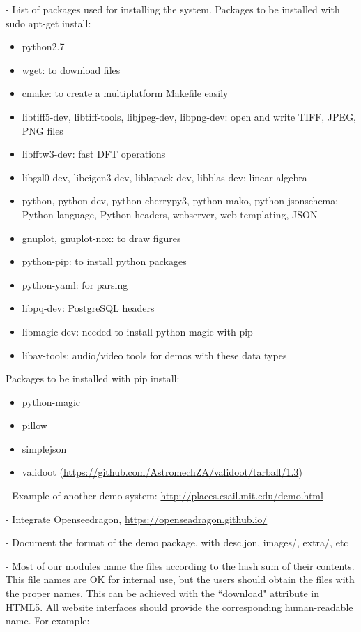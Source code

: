 \documentclass[a4paper,12pt]{article}
\begin{document}
- List of packages used for installing the system. Packages to be installed with sudo apt-get install:

\begin{itemize}
\item python2.7
\item wget: to download files
\item cmake: to create a multiplatform Makefile easily
\item libtiff5-dev, libtiff-tools, libjpeg-dev, libpng-dev: open and write TIFF, JPEG, PNG files
\item libfftw3-dev: fast DFT operations
\item libgsl0-dev, libeigen3-dev, liblapack-dev, libblas-dev: linear algebra
\item python, python-dev, python-cherrypy3, python-mako, python-jsonschema: Python language, Python headers, webserver, web templating, JSON
\item gnuplot, gnuplot-nox: to draw figures
\item python-pip: to install python packages
\item python-yaml: for parsing
\item libpq-dev: PostgreSQL headers
\item libmagic-dev: needed to install python-magic with pip
\item libav-tools: audio/video tools for demos with these data types
\end{itemize}
Packages to be installed with pip install:
\begin{itemize}
\item python-magic
\item pillow
\item simplejson
\item validoot (\url{https://github.com/AstromechZA/validoot/tarball/1.3})
\end{itemize}

- Example of another demo system: \url{http://places.csail.mit.edu/demo.html}

- Integrate Openseedragon, \url{https://openseadragon.github.io/}

- Document the format of the demo package, with desc.jon, images/, extra/, etc

- Most of our modules name the files according to the hash sum of their contents. This file names are OK for internal use, but the users should obtain the files with the proper names. This can be achieved with the ``download" attribute in HTML5. All website interfaces should provide the corresponding human-readable name. For example:
\end{document}

